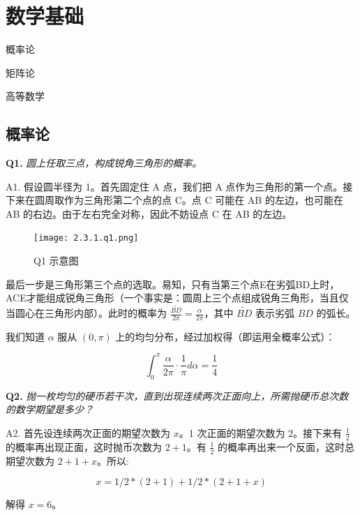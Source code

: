 \documentclass[cn,10pt,math=newtx,citestyle=gb7714-2015,bibstyle=gb7714-2015]{elegantbook}
\begin{document}
\newpage


\section{数学基础}

\begin{introduction}
\item 概率论
\item 矩阵论
\item 高等数学
\end{introduction}

\subsection{概率论}

\textbf{Q1.} \textit{圆上任取三点，构成锐角三角形的概率。}

A1. 假设圆半径为 1。首先固定住 A 点，我们把 A 点作为三角形的第一个点。接下来在圆周取作为三角形第二个点的点 C。点 C 可能在 AB 的左边，也可能在 AB 的右边。由于左右完全对称，因此不妨设点 C 在 AB 的左边。

\begin{figure}[ht]
  \centering
  \texttt{[image: 2.3.1.q1.png]}
  \caption{Q1 示意图}
\end{figure}

最后一步是三角形第三个点的选取。易知，只有当第三个点E在劣弧BD上时，ACE才能组成锐角三角形（一个事实是：圆周上三个点组成锐角三角形，当且仅当圆心在三角形内部）。此时的概率为 $\frac{\tilde{BD}}{2\pi}=\frac{\alpha}{2\pi}$，其中 $\tilde{BD}$ 表示劣弧 $BD$ 的弧长。

我们知道 $\alpha$ 服从 $(0,\pi)$ 上的均匀分布，经过加权得（即运用全概率公式）：

\begin{equation}
\int_{0}^{\pi}\frac{\alpha}{2\pi}\cdot\frac{1}{\pi}d\alpha=\frac{1}{4}
\end{equation}

\textbf{Q2.} \textit{抛一枚均匀的硬币若干次，直到出现连续两次正面向上，所需抛硬币总次数的数学期望是多少？}

A2. 首先设连续两次正面的期望次数为 $x$。1 次正面的期望次数为 $2$。接下来有 $\frac{1}{2}$ 的概率再出现正面，这时抛币次数为 $2+1$。有 $\frac{1}{2}$ 的概率再出来一个反面，这时总期望次数为 $2+1+x$。所以:

\begin{equation}
x=1/2 * (2+1) + 1/2 * (2+1+x)
\end{equation}

解得 $x=6$。\\
\end{document}
